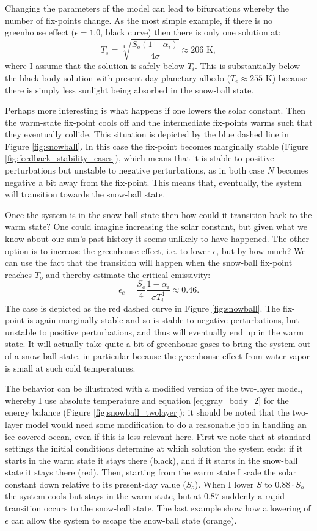 \documentclass[12pt]{book}
\begin{document}
Changing the parameters of the model can lead to bifurcations whereby the number of fix-points change. As the most simple example, if there is no greenhouse effect ($\epsilon=1.0$, black curve) then there is only one solution at:
$$T_s= \sqrt[4]{\frac{S_o(1-\alpha_i)}{4\sigma}} \approx 206 \textrm{ K},$$
where I assume that the solution is safely below $T_i$. This is substantially below the black-body solution with present-day planetary albedo ($T_e\approx 255$ K) because there is simply less sunlight being absorbed in the snow-ball state.

Perhaps more interesting is what happens if one lowers the solar constant. Then the warm-state fix-point cools off and the intermediate fix-points warms such that they eventually collide. This situation is depicted by the blue dashed line in Figure \ref{fig:snowball}. In this case the fix-point becomes marginally stable (Figure \ref{fig:feedback_stability_cases}), which means that it is stable to positive perturbations but unstable to negative perturbations, as in both case $N$ becomes negative a bit away from the fix-point. This means that, eventually, the system will transition towards the snow-ball state. 

Once the system is in the snow-ball state then how could it transition back to the warm state? One could imagine increasing the solar constant, but given what we know about our sun's past history it seems unlikely to have happened. The other option is to increase the greenhouse effect, i.e. to lower $\epsilon$, but by how much? We can use the fact that the transition will happen when the snow-ball fix-point reaches $T_o$ and thereby estimate the critical emissivity:
$$
\epsilon_c = \frac{S_o}{4}\frac{1-\alpha_i}{\sigma T_i^4} \approx 0.46.
$$
The case is depicted as the red dashed curve in Figure \ref{fig:snowball}. The fix-point is again marginally stable and so is stable to negative perturbations, but unstable to positive perturbations, and thus will eventually end up in the warm state. It will actually take quite a bit of greenhouse gases to bring the system out of a snow-ball state, in particular because the greenhouse effect from water vapor is small at such cold temperatures.

The behavior can be illustrated with a modified version of the two-layer model, whereby I use absolute temperature and equation \ref{eq:gray_body_2} for the energy balance (Figure \ref{fig:snowball_twolayer}); it should be noted that the two-layer model would need some modification to do a reasonable job in handling an ice-covered ocean, even if this is less relevant here. First we note that at standard settings the initial conditions determine at which solution the system ends: if it starts in the warm state it stays there (black), and if it starts in the snow-ball state it stays there (red). Then, starting from the warm state I scale the solar constant down relative to its present-day value ($S_o$). When I lower $S$ to $0.88\cdot S_o$ the system cools but stays in the warm state, but at $0.87$ suddenly a rapid transition occurs to the snow-ball state. The last example show how a lowering of $\epsilon$ can allow the system to escape the snow-ball state (orange).
\end{document}

